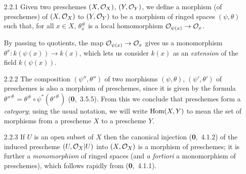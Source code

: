 \documentclass[../main.tex]{subfiles}
\begin{document}
\begin{env}[Definition]{2.2.1}
    Given two preschemes $(X,\mathcal{O}_X)$, $(Y,\mathcal{O}_Y)$, we define a morphism (of preschemes) of $(X,\mathcal{O}_X)$ to $(Y,\mathcal{O}_Y)$ to be a morphism of ringed spaces $(\psi,\theta)$ such that, for all $x\in X$, $\theta_x^\#$ is a local homomorphism $\mathcal{O}_{\psi(x)}\to\mathcal{O}_x$.
\end{env}

By passing to quotients, the map $\mathcal{O}_{\psi(x)}\to\mathcal{O}_x$ gives us a monomorphism $\theta^x\colon k(\psi(x))\to k(x)$, which lets us consider $k(x)$ as an \emph{extension} of the field $k(\psi(x))$.

\begin{env}{2.2.2}
    The composition $(\psi'',\theta'')$ of two morphisms $(\psi,\theta)$, $(\psi',\theta')$ of preschemes is also a morphism of preschemes, since it is given by the formula $\theta''^\#=\theta^\#\circ\psi^*(\theta'^\#)$ (\textbf{0},~3.5.5).
    From this we conclude that preschemes form a \emph{category}; using the usual notation, we will write $\operatorname{Hom}(X,Y)$ to mean the set of morphisms from a prescheme $X$ to a prescheme $Y$.
\end{env}

\begin{env}[Example]{2.2.3}
    If $U$ is an open subset of $X$ then the canonical injection (\textbf{0},~4.1.2) of the induced prescheme $(U,\mathcal{O}_X|U)$ into $(X,\mathcal{O}_X)$ is a morphism of preschemes; it is further a \emph{monomorphism} of ringed spaces (and \emph{a fortiori} a monomorphism of preschemes), which follows rapidly from (\textbf{0},~4.1.1).
\end{env}
\end{document}
